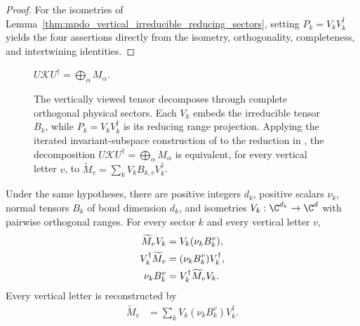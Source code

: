 \begin{proof}
    \leanok
    For the isometries of
    Lemma~\ref{thm:mpdo_vertical_irreducible_reducing_sectors}, setting
    $P_k=V_kV_k^\dagger$ yields the four assertions directly from the
    isometry, orthogonality, completeness, and intertwining identities.
\end{proof}

\begin{figure}[ht]
    \centering
    $U\mathcal K U^\dagger=\bigoplus_\alpha M_\alpha$.
    \caption{The vertically viewed tensor decomposes through complete
        orthogonal physical sectors. Each $V_k$ embeds the irreducible tensor
        $B_k$, while $P_k=V_kV_k^\dagger$ is its reducing range projection.
        Applying the iterated invariant-subspace construction of
        \cite[lines~200--219]{Cirac2016MPDO_arXiv} to the reduction in
        \cite[Proposition~4.13, lines~1873--1887]{Cirac2016MPDO_arXiv}, the
        decomposition $U\mathcal K U^\dagger=\bigoplus_\alpha M_\alpha$ is
        equivalent, for every vertical letter $v$, to
        $\widetilde M_v=\sum_kV_kB_{k,v}V_k^\dagger$.}
    \label{fig:mpdo_vertical_reducing_sectors}
\end{figure}

\begin{lemma}
    \label{thm:mpdo_vertical_normal_sectors_with_isometries}
    \leanok
    Under the same hypotheses, there are positive integers $d_k$, positive
    scalars $\nu_k$, normal tensors $B_k$ of bond dimension $d_k$, and
    isometries $V_k:\C^{d_k}\to\C^d$ with pairwise orthogonal ranges. For
    every sector $k$ and every vertical letter $v$,
    \begin{align}
        \widetilde M_vV_k         & =V_k(\nu_kB_k^v),
        \notag                                                     \\
        V_k^\dagger\widetilde M_v & =(\nu_kB_k^v)V_k^\dagger,
        \notag                                                     \\
        \nu_kB_k^v                & =V_k^\dagger\widetilde M_vV_k.
        \notag
    \end{align}
    Every vertical letter is reconstructed by
    \begin{align}
        \widetilde M_v
         & =\sum_kV_k(\nu_kB_k^v)V_k^\dagger.
        \label{eq:mpdo_vertical_normal_reconstruction}
    \end{align}
\end{lemma}

